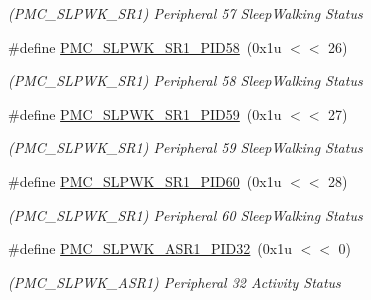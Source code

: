 \begin{DoxyCompactItemize}
\begin{DoxyCompactList}\small\item\em (P\+M\+C\+\_\+\+S\+L\+P\+W\+K\+\_\+\+S\+R1) Peripheral 57 Sleep\+Walking Status \end{DoxyCompactList}\item 
\mbox{\label{group__SAMV71__PMC_gaa52b4dbc91552c8cd37ef2797917e933}} 
\#define \mbox{\hyperlink{group__SAMV71__PMC_gaa52b4dbc91552c8cd37ef2797917e933}{P\+M\+C\+\_\+\+S\+L\+P\+W\+K\+\_\+\+S\+R1\+\_\+\+P\+I\+D58}}~(0x1u $<$$<$ 26)
\begin{DoxyCompactList}\small\item\em (P\+M\+C\+\_\+\+S\+L\+P\+W\+K\+\_\+\+S\+R1) Peripheral 58 Sleep\+Walking Status \end{DoxyCompactList}\item 
\mbox{\label{group__SAMV71__PMC_ga37ee13ef18e767c49075089e51f626f9}} 
\#define \mbox{\hyperlink{group__SAMV71__PMC_ga37ee13ef18e767c49075089e51f626f9}{P\+M\+C\+\_\+\+S\+L\+P\+W\+K\+\_\+\+S\+R1\+\_\+\+P\+I\+D59}}~(0x1u $<$$<$ 27)
\begin{DoxyCompactList}\small\item\em (P\+M\+C\+\_\+\+S\+L\+P\+W\+K\+\_\+\+S\+R1) Peripheral 59 Sleep\+Walking Status \end{DoxyCompactList}\item 
\mbox{\label{group__SAMV71__PMC_ga0fba1f8f21ab792628bcfbadf8414caf}} 
\#define \mbox{\hyperlink{group__SAMV71__PMC_ga0fba1f8f21ab792628bcfbadf8414caf}{P\+M\+C\+\_\+\+S\+L\+P\+W\+K\+\_\+\+S\+R1\+\_\+\+P\+I\+D60}}~(0x1u $<$$<$ 28)
\begin{DoxyCompactList}\small\item\em (P\+M\+C\+\_\+\+S\+L\+P\+W\+K\+\_\+\+S\+R1) Peripheral 60 Sleep\+Walking Status \end{DoxyCompactList}\item 
\mbox{\label{group__SAMV71__PMC_gaed7cd2ef02c6f1713bdccbe5129452e6}} 
\#define \mbox{\hyperlink{group__SAMV71__PMC_gaed7cd2ef02c6f1713bdccbe5129452e6}{P\+M\+C\+\_\+\+S\+L\+P\+W\+K\+\_\+\+A\+S\+R1\+\_\+\+P\+I\+D32}}~(0x1u $<$$<$ 0)
\begin{DoxyCompactList}\small\item\em (P\+M\+C\+\_\+\+S\+L\+P\+W\+K\+\_\+\+A\+S\+R1) Peripheral 32 Activity Status \end{DoxyCompactList}\item 

\end{DoxyCompactItemize}
